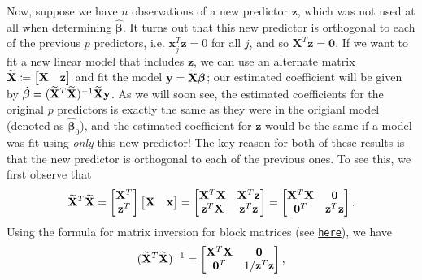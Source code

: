 \documentclass[10pt]{article}
\begin{document}
Now, suppose we have \(n\) observations of a new predictor \(\mathbf{z}\), which was not used at all when determining \(\hat{\bm{\beta}}\). 
It turns out that this new predictor is orthogonal to each of the previous \(p\) predictors, i.e. \(\mathbf{x}_j^T\mathbf{z} = 0\) for all \(j\), 
and so \(\mathbf{X}^T\mathbf{z} = \mathbf{0}\). If we want to fit a new linear model that includes \(\mathbf{z}\), we can use an alternate 
matrix \(\widetilde{\mathbf{X}} \coloneqq \begin{bmatrix}
    \mathbf{X} & \mathbf{z}
\end{bmatrix}\) and fit the model \(\mathbf{y} = \widetilde{\mathbf{X}} \bm{\beta}\); our estimated coefficient will be given by \(\hat{\bm{\beta}} = (\widetilde{\mathbf{X}}^T\widetilde{\mathbf{X}})^{-1}\widetilde{\mathbf{X}}\mathbf{y}\).
As we will soon see, the estimated coefficients for the original \(p\) predictors is exactly the same as they were in the origianl model (denoted as \(\hat{\bm{\beta}}_0\)), 
and the estimated coefficient for \(\mathbf{z}\) would be the same if a model was fit using \textsl{only} this new predictor!
The key reason for both of these results is that the new predictor is orthogonal to each of the previous ones. 
To see this, we first observe that 
\begin{align*}
    \widetilde{\mathbf{X}}^T\widetilde{\mathbf{X}}
    = \begin{bmatrix}
        \mathbf{X}^T \\ \mathbf{z}^T
    \end{bmatrix}
    \begin{bmatrix}
        \mathbf{X} & \mathbf{x}
    \end{bmatrix}
    = \begin{bmatrix}
        \mathbf{X}^T\mathbf{X} & \mathbf{X}^T\mathbf{z} \\
        \mathbf{z}^T \mathbf{X} & \mathbf{z}^T\mathbf{z}
    \end{bmatrix}
    = \begin{bmatrix}
        \mathbf{X}^T\mathbf{X} & \mathbf{0} \\
        \mathbf{0}^T & \mathbf{z}^T\mathbf{z}
    \end{bmatrix}.
\end{align*}
Using the formula for matrix inversion for block matrices (see \href{https://en.wikipedia.org/wiki/Block_matrix#Block_matrix_inversion}{\texttt{here}}), we have 
\begin{align*}
    (\widetilde{\mathbf{X}}^T\widetilde{\mathbf{X}})^{-1}
    = \begin{bmatrix}
        \mathbf{X}^T\mathbf{X} & \mathbf{0} \\
        \mathbf{0}^T & 1 / \mathbf{z}^T\mathbf{z}
    \end{bmatrix},
\end{align*}
\end{document}
